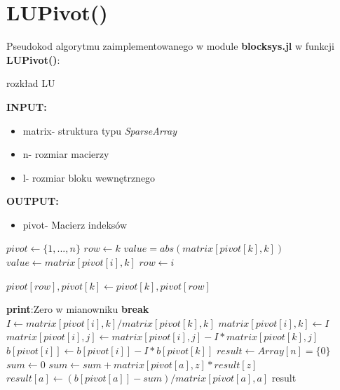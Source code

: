 \documentclass[a4paper,14pt]{report}
\begin{document}
  \section{LUPivot()}
  Pseudokod algorytmu zaimplementowanego w module \textbf{blocksys.jl} w funkcji \textbf{LUPivot()}:
    \begin{algorithm}[H]
    \caption{rozkład LU}
    \textbf{INPUT:}
    \begin{itemize}
      \item matrix- struktura typu \textit{SparseArray}
      \item n- rozmiar macierzy
      \item l- rozmiar bloku wewnętrznego
    \end{itemize}
    \textbf{OUTPUT:}
    \begin{itemize}
      \item pivot- Macierz indeksów
    \end{itemize}
    \begin{algorithmic} 
      \STATE $pivot \leftarrow \{1,...,n\}$
        \STATE $row \leftarrow k$
        \STATE $value=abs(matrix[pivot[k],k])$
            \STATE $value \leftarrow matrix[pivot[i],k]$
            \STATE $row \leftarrow i$
          \ENDIF
        \ENDFOR

        \STATE $pivot[row],pivot[k] \leftarrow pivot[k],pivot[row]$



            \STATE \textbf{print}:Zero w mianowniku
            \STATE \textbf{break}
          \ENDIF
          \STATE $I \leftarrow matrix[pivot[i],k]/matrix[pivot[k],k]$
          \STATE $matrix[pivot[i],k] \leftarrow I$
            \STATE $matrix[pivot[i],j] \leftarrow matrix[pivot[i],j]-I*matrix[pivot[k],j]$
          \ENDFOR
          \STATE $b[pivot[i]] \leftarrow b[pivot[i]]-I*b[pivot[k]]$
        \ENDFOR
        \STATE $result \leftarrow Array[n]=\{0\}$
          \STATE $sum \leftarrow 0$
            \STATE $sum \leftarrow sum+matrix[pivot[a],z]*result[z]$
          \ENDFOR
          \STATE $result[a] \leftarrow (b[pivot[a]]-sum)/matrix[pivot[a],a]$
        \ENDFOR
      \ENDFOR
      \RETURN result
      \end{algorithmic}
  \end{algorithm}
\end{document}
